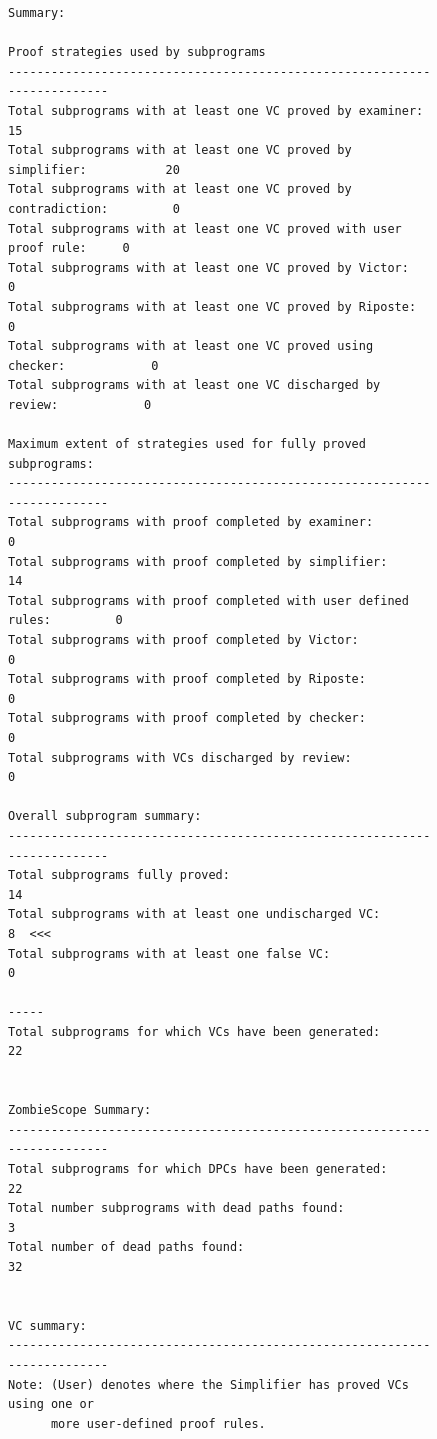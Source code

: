 \begin{figure}
\singlespacing
\begin{lstlisting}[frame=single, gobble=0]
Summary:

Proof strategies used by subprograms
-------------------------------------------------------------------------
Total subprograms with at least one VC proved by examiner:             15
Total subprograms with at least one VC proved by simplifier:           20
Total subprograms with at least one VC proved by contradiction:         0
Total subprograms with at least one VC proved with user proof rule:     0
Total subprograms with at least one VC proved by Victor:                0
Total subprograms with at least one VC proved by Riposte:               0
Total subprograms with at least one VC proved using checker:            0
Total subprograms with at least one VC discharged by review:            0

Maximum extent of strategies used for fully proved subprograms:
-------------------------------------------------------------------------
Total subprograms with proof completed by examiner:                     0
Total subprograms with proof completed by simplifier:                  14
Total subprograms with proof completed with user defined rules:         0
Total subprograms with proof completed by Victor:                       0
Total subprograms with proof completed by Riposte:                      0
Total subprograms with proof completed by checker:                      0
Total subprograms with VCs discharged by review:                        0

Overall subprogram summary:
-------------------------------------------------------------------------
Total subprograms fully proved:                                        14
Total subprograms with at least one undischarged VC:                    8  <<<
Total subprograms with at least one false VC:                           0
                                                                    -----
Total subprograms for which VCs have been generated:                   22


ZombieScope Summary:
-------------------------------------------------------------------------
Total subprograms for which DPCs have been generated:                  22
Total number subprograms with dead paths found:                         3
Total number of dead paths found:                                      32


VC summary:
-------------------------------------------------------------------------
Note: (User) denotes where the Simplifier has proved VCs using one or
      more user-defined proof rules.


\end{lstlisting}
\end{figure}
